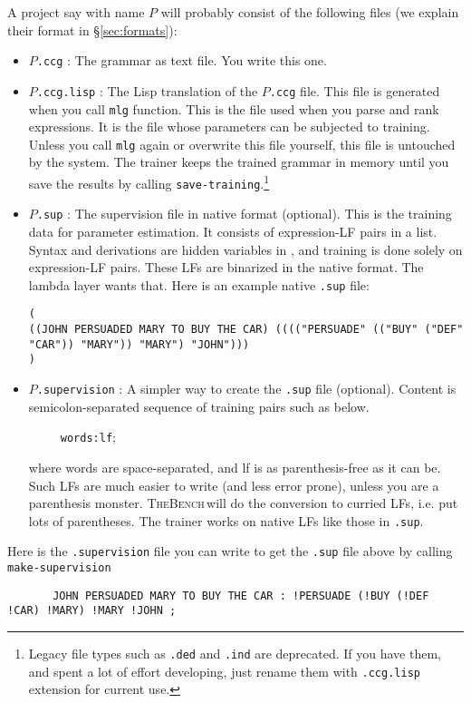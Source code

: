 \documentclass[11pt]{article}
\newcommand{\tool}{\textsc{TheBench}}
\begin{document}
A project say with name $P$ will probably consist of the following files (we explain their format in \S\ref{sec:formats}):
\begin{itemize}
\setlength{\itemsep}{0pt}
\setlength{\parskip}{0pt}
\setlength{\parsep}{0pt}
\item $P$\verb|.ccg| : The  grammar as text file. You write this one.
\item $P$\verb+.ccg.lisp+ : The Lisp translation of the $P$\verb+.ccg+ file. This file is generated when
you call \verb+mlg+ function. This is the file  used when you parse and rank expressions.
It is the file  whose parameters can be subjected to training. {Unless you call} \verb+mlg+ {again or overwrite this file yourself, this file is untouched by the system. The trainer keeps the trained grammar in memory until you save the results by calling} \verb+save-training+.\footnote{Legacy file types such as \verb+.ded+ and \verb+.ind+ are deprecated. If you have them, and spent a lot of effort
developing, just rename them with \verb+.ccg.lisp+ extension for current use.}

\item $P$\verb|.sup| : The supervision file in native format (optional). This is the training data for  parameter estimation. It consists of expression-LF pairs in a list. Syntax and derivations are hidden variables in , and training is done solely on expression-LF pairs. 
{These LFs are binarized in the native format. The lambda layer wants that.}
Here is an example native \verb+.sup+ file:
{\scriptsize\begin{verbatim}
(
((JOHN PERSUADED MARY TO BUY THE CAR) (((("PERSUADE" (("BUY" ("DEF" "CAR")) "MARY")) "MARY") "JOHN")))
)
\end{verbatim}}

\item $P$\verb|.supervision| : {A simpler way to create the} \verb|.sup| file (optional). Content is semicolon-separated
sequence of training pairs such as below.  

~~~~~{\texttt{words:lf};}

where words are space-separated, and lf is as parenthesis-free as it can be.
Such LFs are much easier to write (and less error prone),  unless you are a parenthesis monster. {\tool\,will do the conversion
to curried LFs, i.e. put lots of parentheses. The trainer works on native LFs like those in} \verb+.sup+.
\end{itemize}
Here is the \verb+.supervision+ file you can write to get the \verb+.sup+ file above by calling \verb+make-supervision+
{\scriptsize\begin{verbatim}
       JOHN PERSUADED MARY TO BUY THE CAR : !PERSUADE (!BUY (!DEF !CAR) !MARY) !MARY !JOHN ;
\end{verbatim}}
\end{document}
